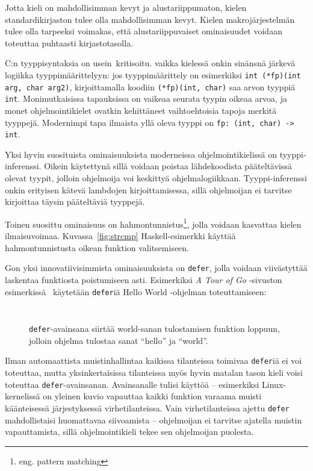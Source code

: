 \FloatBarrier

Jotta kieli on mahdollisimman kevyt ja alustariippumaton, kielen
standardikirjaston tulee olla mahdollisimman kevyt. Kielen makrojärjestelmän
tulee olla tarpeeksi voimakas, että alustariippuvaiset ominaisuudet voidaan
toteuttaa puhtaasti kirjastotasolla.

C:n tyyppisyntaksia on usein~\citationneeded kritisoitu. vaikka kielessä onkin
sinänsnä järkevä logiikka tyyppimäärittelyyn: jos tyyppimäärittely on esimerkiksi
\texttt{int (*fp)(int arg, char arg2)}, kirjoittamalla koodiin
\texttt{(*fp)(int, char)} saa arvon tyyppiä \texttt{int}. Monimutkaisissa
tapauksissa on vaikeaa seurata tyypin oikeaa arvoa, ja monet ohjelmointikielet
ovatkin kehittäneet vaihtoehtoisia tapoja merkitä tyyppejä. Modernimpi tapa
ilmaista yllä oleva tyyppi on \texttt{fp: (int, char) -> int}.

Yksi hyvin suosituista ominaisuuksista moderneissa ohjelmointikielissä on
tyyppi-inferenssi. Oikein käytettynä sillä voidaan poistaa lähdekoodista
pääteltävissä olevat tyypit, jolloin ohjelmoija voi keskittyä ohjelmalogiikkaan.
Tyyppi-inferenssi onkin erityisen kätevä lambdojen kirjoittamisessa, sillä
ohjelmoijan ei tarvitse kirjoittaa täysin pääteltäviä tyyppejä.

Toinen suosittu ominaisuus on hahmontunnistus\footnote{eng. pattern matching},
jolla voidaan kasvattaa kielen ilmaisuvoimaa. Kuvassa~\ref{fig:strcmp}
Haskell-esimerkki käyttää hahmontunnistusta oikean funktion valitsemiseen.

Gon yksi innovatiivisimmista ominaisuuksista on \texttt{defer}, jolla voidaan
viivästyttää laskentaa funktiosta poistumiseen asti. Esimerkiksi \emph{A Tour
of Go} -sivuston esimerkissä~\citep{gotourdefer} käytetään \texttt{defer}iä
Hello World -ohjelman toteuttamiseen:

\begin{figure}[ht!]
    \inputminted{Go}{defer.go}
    \inputminted{text}{defer-output}
    \caption{\texttt{defer}-avainsana siirtää world-sanan tulostamisen funktion
    loppuun, jolloin ohjelma tulostaa sanat ``hello'' ja ``world''.}
\end{figure}

\FloatBarrier

Ilman automaattista muistinhallintaa kaikissa tilanteissa toimivaa
\texttt{defer}iä ei voi toteuttaa, mutta yksinkertaisissa tilanteissa myös
hyvin matalan tason kieli voisi toteuttaa \texttt{defer}-avainsanan.
Avainsanalle tulisi käyttöä -- esimerkiksi Linux-kernelissä on yleinen kuvio
vapauttaa kaikki funktion varaama muisti käänteisessä järjestyksessä
virhetilanteissa. Vain virhetilanteissa ajettu \texttt{defer} mahdollistaisi
huomattavaa siivoamista -- ohjelmoijan ei tarvitse ajatella muistin
vapauttamista, sillä ohjelmointikieli tekee sen ohjelmoijan puolesta.

